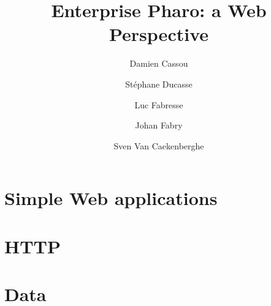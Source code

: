\documentclass[10pt,twoside,showtrims]{support/latex/sbabook}
\title{Enterprise Pharo: a Web Perspective}
\author{
    Damien Cassou \and
    Stéphane Ducasse \and
    Luc Fabresse \and
    Johan Fabry \and
    Sven Van Caekenberghe}
\begin{document}
\begin{titlingpage}
    \setlength\droptitle{5cm}
    \pretitle{\begin{flushright}\HUGE\sffamily}
    \posttitle{\par\end{flushright}\vskip 1cm}
    \postauthor{\end{tabular}\par}
    \maketitle
\end{titlingpage}

\frontmatter
\tableofcontents

\sloppy %
\mainmatter



\part{Simple Web applications}







\part{HTTP}














\part{Data}










\end{document}
